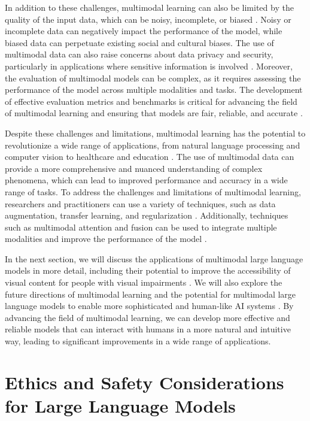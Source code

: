 \documentclass[11pt]{article}
\begin{document}
In addition to these challenges, multimodal learning can also be limited by the quality of the input data, which can be noisy, incomplete, or biased \cite{ref301}. Noisy or incomplete data can negatively impact the performance of the model, while biased data can perpetuate existing social and cultural biases. The use of multimodal data can also raise concerns about data privacy and security, particularly in applications where sensitive information is involved \cite{ref302}. Moreover, the evaluation of multimodal models can be complex, as it requires assessing the performance of the model across multiple modalities and tasks. The development of effective evaluation metrics and benchmarks is critical for advancing the field of multimodal learning and ensuring that models are fair, reliable, and accurate \cite{ref303}.

Despite these challenges and limitations, multimodal learning has the potential to revolutionize a wide range of applications, from natural language processing and computer vision to healthcare and education \cite{ref304}. The use of multimodal data can provide a more comprehensive and nuanced understanding of complex phenomena, which can lead to improved performance and accuracy in a wide range of tasks. To address the challenges and limitations of multimodal learning, researchers and practitioners can use a variety of techniques, such as data augmentation, transfer learning, and regularization \cite{ref305}. Additionally, techniques such as multimodal attention and fusion can be used to integrate multiple modalities and improve the performance of the model \cite{ref306}.

In the next section, we will discuss the applications of multimodal large language models in more detail, including their potential to improve the accessibility of visual content for people with visual impairments \cite{ref294}. We will also explore the future directions of multimodal learning and the potential for multimodal large language models to enable more sophisticated and human-like AI systems \cite{ref307}. By advancing the field of multimodal learning, we can develop more effective and reliable models that can interact with humans in a more natural and intuitive way, leading to significant improvements in a wide range of applications.

\section{Ethics and Safety Considerations for Large Language Models}
\end{document}
